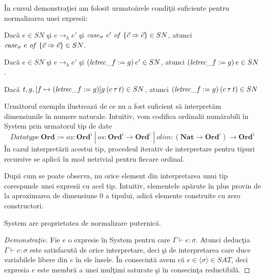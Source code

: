 \begin{lemma}\label{cond_reductibil}
\^ In cursul demonstra\c tiei am folosit urmato\u arele condi\c tii suficiente pentru nor\-ma\-li\-za\-re\-a unei expresii:
\begin{enumerate*}
\item Dac\u a $e \in SN$ \c si $e \to_k e'$ \c si $\text{\emph{case}}_{\sigma}\ e' \text{ \emph{of} } \{ \vec{c} \Rightarrow \vec{e} \}  \in SN$, atunci $\text{\emph{case}}_{\sigma}\ e \text{ \emph{of} } \{ \vec{c} \Rightarrow \vec{e} \} \in SN$.

\item Dac\u a $e \in SN$ \c si $e \to_k e'$ \c si $(\text{\emph{letrec}}_{\dots} f :=  g)\hspace{2pt} e' \in SN$, atunci $(\text{\emph{letrec}}_{\dots} f :=  g)\hspace{2pt} e \in SN$.

\item Dac\u a $t,g, [f \mapsto(\text{\emph{letrec}}_{\dots} f :=  g)] g\hspace{2pt} (c\hspace{2pt} \tau\hspace{2pt} t) \in SN$, atunci $(\text{\emph{letrec}}_{\dots} f :=  g) \hspace{2pt} (c\hspace{2pt} \tau\hspace{2pt} t) \in SN$
\end{enumerate*}
\end{lemma}

\begin{remark}
Urm\u atorul exemplu ilustreaz\u a de ce nu a fost suficient s\u a interpret\u am dimensiunile \^ in numere naturale. Intuitiv, vom codifica ordinalii num\u arabili \^ in System \fhat prin urmatorul tip de date
$$ Datatype \ \textbf{Ord} := oz : \textbf{Ord}^{\hat{\iota}} \:|\: os : \textbf{Ord}^{{\iota}} \to \textbf{Ord}^{\hat{\iota}} \:|\: olim : (\textbf{Nat} \to \textbf{Ord}^{{\iota}}) \to \textbf{Ord}^{\hat{\iota}}$$
\^ In cazul interpret\u arii acestui tip, procedeul iterativ de interpretare pentru tipuri recursive se aplic\u a \^ in mod netrivial pentru fiecare ordinal.
\end{remark}

\begin{remark}
Dup\u a cum se poate observa, nu orice element din interpretarea unui tip corespunde unei expresii cu acel tip. Intuitiv, elementele ap\u arute \^ in plus provin de la aproximarea de dimensiune 0 a tipului, adic\u a elemente construite cu zero constructori.
\end{remark}

\begin{corollary}
System \fhat are proprietatea de normalizare puternic\u a.
\end{corollary}
\begin{proof}[Demonstra\c tie]
Fie $e$ o expresie \^ in System \fhat pentru care $\Gamma \vdash e : \sigma$. Atunci deduc\c tia $\Gamma \vdash e : \sigma$ este satisfacut\u a de orice interpretare, deci \c si de interpretarea care duce variabilele libere din $e$ \^ in ele \^ insele. \^ In consecint\u a avem c\u a $e \in \langle \sigma \rangle \in SAT$, deci expresia $e$ este membr\u a a unei mul\c timi saturate \c si \^ in consecin\c ta reductibil\u a.
\end{proof}

